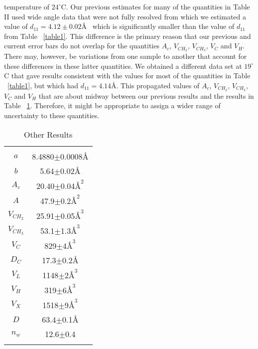temperature of $24^{\circ}$C. Our previous estimates for many of the quantities 
in Table II \cite{WSN89} used wide angle data that were not fully resolved from 
which we estimated a value of $d_{11}=4.12 \pm 0.02$\AA~ which is significantly
smaller than the value of $d_{11}$ from Table \ \ref{table1}.
This difference is the primary reason that our previous \cite{WSN89}
and current error bars do not overlap for the quantities
$A_{c}$, $V_{CH_{2}}$, $V_{CH_{3}}$, $V_{C}$ and $V_{H}$. There may, however, be 
variations from one sample to another that account for
these differences in these latter quantities.  We obtained a different data
set at $19^{\circ}$C that gave results consistent with the values for
most of the quantities in Table \ \ref{table1}, but which had $d_{11}=4.14$\AA.
This propagated values of $A_{c}$, $V_{CH_{2}}$, $V_{CH_{3}}$, $V_{C}$ and $V_{H}$ 
that are about midway between our previous results \cite{WSN89} and the
results in Table \ \ref{table2}.  Therefore, it might be appropriate to assign a
wider range of uncertainty to these quantities.

\begin{table}
\caption{Other Results
\label{table2}}
\begin{center}
\begin{tabular}{cc}
\hline \hline \\
$a$             & 8.4880$\pm$0.0008\AA\\
$b$             & 5.64$\pm$0.02\AA\\
$A_{c}$         & 20.40$\pm$0.04${\mbox{\AA}}^{2}$\\
$A$             & 47.9$\pm$0.2${\mbox{\AA}}^{2}$\\
$V_{{CH}_2}$    & 25.91$\pm$0.05${\mbox{\AA}}^{3}$\\
$V_{{CH}_3}$    & 53.1$\pm$1.3${\mbox{\AA}}^{3}$\\
$V_{C}$         & 829$\pm$4${\mbox{\AA}}^{3}$\\
$D_{C}$         & 17.3$\pm$0.2\AA\\
$V_{L}$         & 1148$\pm$2${\mbox{\AA}}^{3}$\\
$V_{H}$         & 319$\pm$6${\mbox{\AA}}^{3}$\\
$V_{X}$         & 1518$\pm$9${\mbox{\AA}}^{3}$\\
$D$             & 63.4$\pm$0.1\AA\\
$n_{w}$         & 12.6$\pm$0.4\\
\hline \hline \\
\end{tabular}
\end{center}
\end{table}
